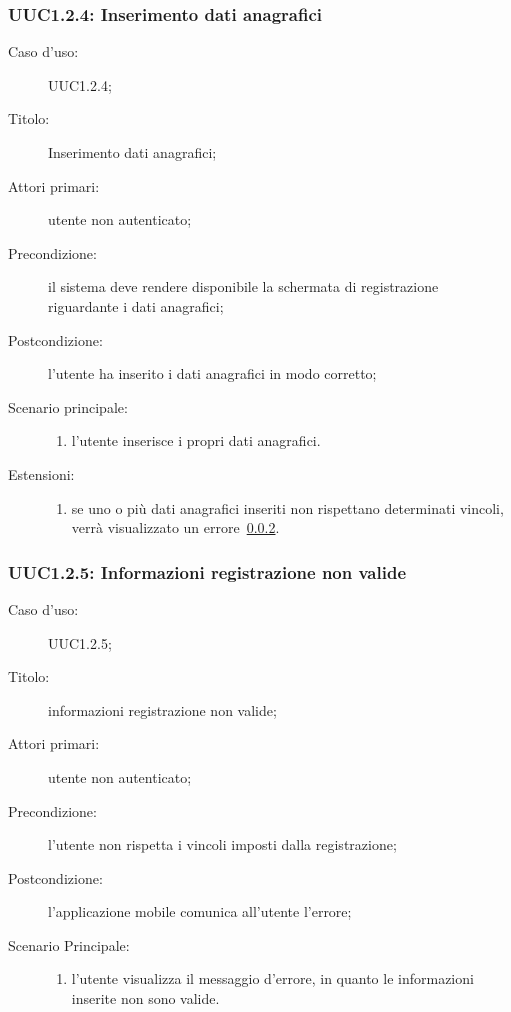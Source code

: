 \documentclass[../../../analisi-dei-requisiti.tex]{subfiles}
\begin{document}
\subsubsection{UUC1.2.4: Inserimento dati anagrafici}%
\label{subs:UUC1.2.4}
\begin{description}
  \item[Caso d’uso:] UUC1.2.4;
  \item[Titolo:] Inserimento dati anagrafici;
  \item[Attori primari:] utente non autenticato;
  \item[Precondizione:] il sistema deve rendere disponibile la schermata di registrazione riguardante i dati anagrafici;
  \item[Postcondizione:] l'utente ha inserito i dati anagrafici in modo corretto;
  \item[Scenario principale:]
  \begin{enumerate}
    \item l'utente inserisce i propri dati anagrafici.
  \end{enumerate}
  \item[Estensioni:]
  \begin{enumerate}
    \item se uno o più dati anagrafici inseriti non rispettano determinati vincoli, verrà visualizzato un errore~\ref{subs:UUC1.2.5}.
  \end{enumerate}
\end{description}



\subsubsection{UUC1.2.5: Informazioni registrazione non valide}%
\label{subs:UUC1.2.5}
\begin{description}
  \item[Caso d’uso:] UUC1.2.5;
  \item[Titolo:] informazioni registrazione non valide;
  \item[Attori primari:] utente non autenticato;
  \item[Precondizione:] l'utente non rispetta i vincoli imposti dalla registrazione;
  \item[Postcondizione:] l'applicazione mobile comunica all'utente l'errore;
  \item[Scenario Principale:]
        \begin{enumerate}
          \item l'utente visualizza il messaggio d'errore, in quanto le informazioni inserite non sono valide.
        \end{enumerate}
\end{description}
\end{document}
